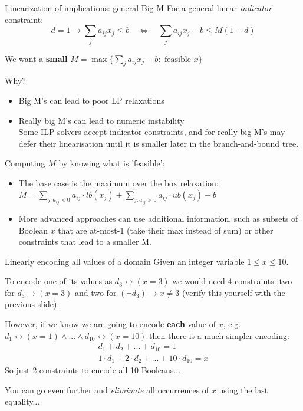 \documentclass{cons-beamer}
\begin{document}
\begin{frame}{Linearization of implications: general Big-M}
	For a general linear \textit{indicator} constraint:
	\vspace{-0.5em}
	\[
	d = 1 \rightarrow \sum_{j} a_{ij}x_j \leq b 
	\quad\Leftrightarrow\quad \sum_{j} a_{ij}x_j - b \leq M(1-d)
	\]
	\vspace{-0.5em}
	
	We want a \textbf{small} 
	$M = \max \{ \sum_{j} a_{ij}x_j - b : \text{ feasible } x \}$
	
	
	Why?
	\begin{itemize}
		\item Big M's can lead to poor LP relaxations
		\item Really big M's can lead to numeric instability\\
		Some ILP solvers accept indicator constraints, and for really big M's may defer their linearisation until it is smaller later in the branch-and-bound tree.
	\end{itemize}
	\pause
	
	Computing $M$ by knowing what is 'feasible':
	
	\begin{itemize}
		\item The base case is the maximum over the box relaxation: \\
		$M = \sum_{j : a_{ij} < 0} a_{ij} \cdot lb(x_j) + \sum_{j : a_{ij} > 0} a_{ij} \cdot ub(x_j) - b$
		
		\item More advanced approaches can use additional information, such as subsets of Boolean $x$ that are at-most-1 (take their max instead of sum) or other constraints that lead to a smaller M.
	\end{itemize}
	
\end{frame}

\begin{frame}{Linearly encoding all values of a domain}
	Given an integer variable $1 \leq x \leq 10$.
	\vfill
	
	To encode one of its values as $d_3 \leftrightarrow (x = 3)$ we would need $4$ constraints: two for $d_3 \rightarrow(x=3)$ and two for $(\neg d_3) \rightarrow x \neq 3$ {\small(verify this yourself with the previous slide)}.
	\vfill 
	\pause
	
	However, if we know we are going to encode \textbf{each} value of $x$, e.g.
	$d_1 \leftrightarrow (x = 1) \land ... \land d_{10} \leftrightarrow (x = 10)$ then there is a much simpler encoding:
	\begin{align*}
		d_1 + d_2 + ... + d_{10} = 1 \\
		1\cdot d_1 + 2\cdot d_2 + ... + 10\cdot d_{10} = x 
	\end{align*}
	So just 2 constraints to encode all 10 Booleans...
	\vfill
	\pause
	
	You can go even further and \textit{eliminate} all occurrences of $x$ using the last equality...
\end{frame}
\end{document}
